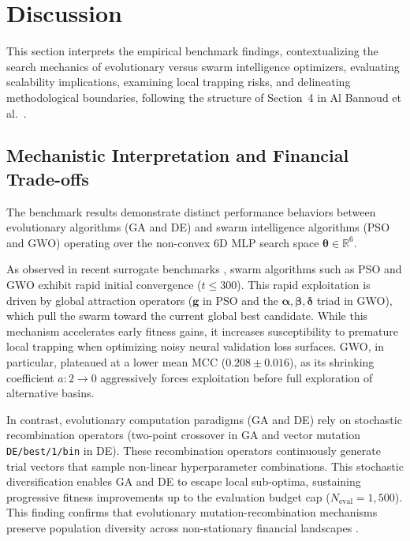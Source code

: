 
\section{Discussion}\label{sec:discussion}

This section interprets the empirical benchmark findings, contextualizing the search mechanics of evolutionary versus swarm intelligence optimizers, evaluating scalability implications, examining local trapping risks, and delineating methodological boundaries, following the structure of Section~4 in Al Bannoud et al.\ \cite{al_bannoud2026accelerating}.

\subsection{Mechanistic Interpretation and Financial Trade-offs}\label{sec:disc_interpretation}

The benchmark results demonstrate distinct performance behaviors between evolutionary algorithms (GA and DE) and swarm intelligence algorithms (PSO and GWO) operating over the non-convex 6D MLP search space $\bm{\theta} \in \mathbb{R}^6$.

As observed in recent surrogate benchmarks \cite{al_bannoud2026accelerating}, swarm algorithms such as PSO and GWO exhibit rapid initial convergence ($t \le 300$). This rapid exploitation is driven by global attraction operators ($\bm{g}$ in PSO and the $\bm{\alpha}, \bm{\beta}, \bm{\delta}$ triad in GWO), which pull the swarm toward the current global best candidate. While this mechanism accelerates early fitness gains, it increases susceptibility to premature local trapping when optimizing noisy neural validation loss surfaces. GWO, in particular, plateaued at a lower mean MCC ($0.208 \pm 0.016$), as its shrinking coefficient $a: 2 \to 0$ aggressively forces exploitation before full exploration of alternative basins.

In contrast, evolutionary computation paradigms (GA and DE) rely on stochastic recombination operators (two-point crossover in GA and vector mutation \texttt{DE/best/1/bin} in DE). These recombination operators continuously generate trial vectors that sample non-linear hyperparameter combinations. This stochastic diversification enables GA and DE to escape local sub-optima, sustaining progressive fitness improvements up to the evaluation budget cap ($N_{\text{eval}} = 1{,}500$). This finding confirms that evolutionary mutation-recombination mechanisms preserve population diversity across non-stationary financial landscapes \cite{bashir2026evobagnet}.

